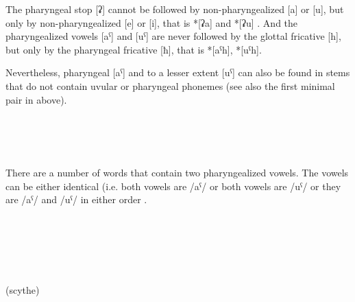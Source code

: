 The pharyngeal stop [ʡ] cannot be followed by non-pharyngealized [a] or [u], but only by non-pharyngealized [e] or [i], that is *[ʡa] and *[ʡu] . And the pharyngealized vowels [aˁ] and [uˁ] are never followed by the glottal fricative [h], but only by the pharyngeal fricative [ħ], that is *[aˁh], *[uˁh].

Nevertheless, pharyngeal [aˁ] and to a lesser extent [uˁ] can also be found in stems that do not contain uvular or pharyngeal phonemes  (see also the first minimal pair in  above).
%
\begin{exe}
	\ex	\label{ex:not uvular phon}
\TabPositions{12em}
		 	\tab 		{} 	\\
		 	\tab 		{} 	\\
		 	\tab 		{} 	\\
		 	\tab 		{} 	

\end{exe}

There are a number of words that contain two pharyngealized vowels. The vowels can be either identical (i.e. both vowels are /aˁ/ or both vowels are /uˁ/ or they are /aˁ/ and /uˁ/ in either order .
%
\begin{exe}
	\ex	\label{ex:two pharyngealized vowels phon}
\TabPositions{18em}
		 	\tab 	{} 	\\
		 		\tab 	{} 	\\
		 		\tab 	{} 			\\
		 		\tab 	{} 	\\
		  	\tab {} 	 \\
		(scythe) 
\end{exe}

